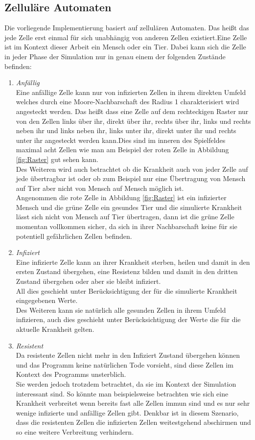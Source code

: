 \subsection*{Zelluläre Automaten}
Die vorliegende Implementierung basiert auf zellulären Automaten. Das heißt das jede Zelle erst einmal für sich unabhängig von anderen Zellen existiert.Eine Zelle ist im Kontext dieser Arbeit ein Mensch oder ein Tier. Dabei kann sich die Zelle in jeder Phase der Simulation nur in genau einem der folgenden Zustände befinden:
\begin{enumerate}
\item{\emph{Anfällig}\\
Eine anfällige Zelle kann nur von infizierten Zellen in ihrem direkten Umfeld welches durch eine Moore-Nachbarschaft \cite{Weisstein:2014} des Radius 1 charakterisiert wird angesteckt werden. Das heißt dass eine Zelle auf dem rechteckigen Raster nur von den Zellen links über ihr, direkt über ihr, rechts über ihr, links und rechts neben ihr und links neben ihr, links unter ihr, direkt unter ihr und rechts unter ihr angesteckt werden kann.Dies sind im inneren des Spielfeldes maximal acht Zellen wie man am Beispiel der roten Zelle in Abbildung \ref{fig:Raster} gut sehen kann.\\
Des Weiteren wird auch betrachtet ob die Krankheit auch von jeder Zelle auf jede übertragbar ist oder ob zum Beispiel nur eine Übertragung von Mensch auf Tier aber nicht von Mensch auf Mensch möglich ist.\\
Angenommen die rote Zelle in Abbildung \ref{fig:Raster} ist ein infizierter Mensch und  die grüne Zelle ein gesundes Tier und die simulierte Krankheit lässt sich nicht von Mensch auf Tier übertragen, dann ist die grüne Zelle momentan vollkommen sicher, da sich in ihrer Nachbarschaft keine für sie potentiell gefährlichen Zellen befinden. 
}
\item{\emph{Infiziert}\\
Eine infizierte Zelle kann an ihrer Krankheit sterben, heilen und damit in den ersten Zustand übergehen, eine Resistenz bilden und damit in den dritten Zustand übergehen oder aber sie bleibt infiziert.\\
All dies geschieht unter Berücksichtigung der für die simulierte Krankheit eingegebenen Werte.\\
Des Weiteren kann sie natürlich alle gesunden Zellen in ihrem Umfeld infizieren, auch dies geschieht unter Berücksichtigung der Werte die für die aktuelle Krankheit gelten.
}
\item{\emph{Resistent}\\
Da resistente Zellen nicht mehr in den Infiziert Zustand übergehen können und das Programm keine natürlichen Tode vorsieht, sind diese Zellen im Kontext des Programms unsterblich.\\
Sie werden jedoch trotzdem betrachtet, da sie im Kontext der Simulation interessant sind. So könnte man beispielsweise betrachten wie sich eine Krankheit verbreitet wenn bereits fast alle Zellen immun sind und es nur sehr wenige infizierte und anfällige Zellen gibt. Denkbar ist in diesem Szenario, dass die resistenten Zellen die infizierten Zellen weitestgehend abschirmen und so eine weitere Verbreitung verhindern. 
}


\end{enumerate}
